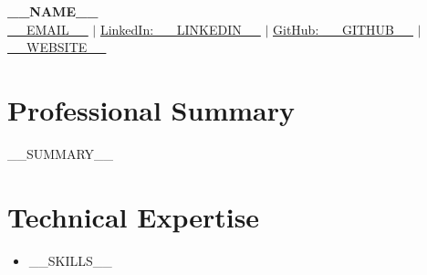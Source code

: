\documentclass[letterpaper,11pt]{article}
\makeatletter
\newcommand{\resumeItem}[1]{
  \item\small{
    {#1 \vspace{-2pt}}
  }
}
\newcommand{\resumeSubheading}[4]{
  \item
    \begin{tabular*}{0.97\textwidth}[t]{l@{\extracolsep{\fill}}r}
      \normalsize \textbf{#1} & \scriptsize#2 \\
      \small #3  \\
    \end{tabular*}\vspace{-12pt}
}
\newcommand{\resumeSubHeadingListStart}{\begin{itemize}[leftmargin=0.15in, label={}]}
\newcommand{\resumeSubHeadingListEnd}{\end{itemize}}
\newcommand{\resumeItemListStart}{\begin{itemize}\vspace{-8pt}}
\makeatother
\begin{document}

\hypersetup{urlcolor = black} %

\begin{center}
    \textbf{\LARGE __NAME__} \\ \vspace{3pt}
    \small
     \hspace{.5pt} {\underline{__EMAIL__}}
    $|$
     \hspace{.5pt} {\underline{LinkedIn: __LINKEDIN__}}
    $|$
     \hspace{.5pt} {\underline{GitHub: __GITHUB__}}
    $|$
 \hspace{.5pt} {\underline{__WEBSITE__}}
\end{center}
\vspace{-18pt}

\hypersetup{urlcolor = linkcolor} %

\section{Professional Summary}
__SUMMARY__


\section{Technical Expertise}
\resumeSubHeadingListStart
  \resumeItem{
    \small{
      __SKILLS__\\[-5pt]
    }
  }
\resumeSubHeadingListEnd
\vspace{-5pt}

        
      
\end{document}
